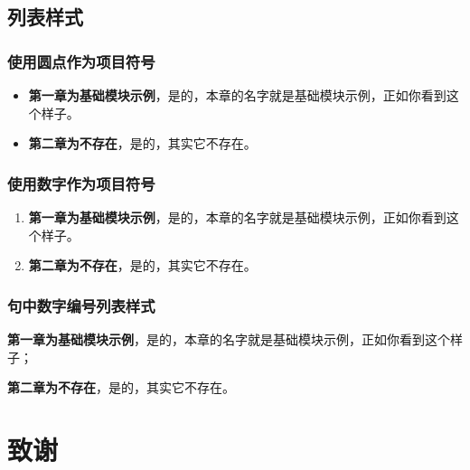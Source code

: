 \documentclass[a4paper,AutoFakeBold,oneside,12pt]{book}
\begin{document}
\section{列表样式}

\subsection{使用圆点作为项目符号}

\begin{itemize}
\item \textbf{第一章为基础模块示例}，是的，本章的名字就是基础模块示例，正如你看到这个样子。
\item \textbf{第二章为不存在}，是的，其实它不存在。
\end{itemize}

\subsection{使用数字作为项目符号}

\begin{enumerate}
\item \textbf{第一章为基础模块示例}，是的，本章的名字就是基础模块示例，正如你看到这个样子。
\item \textbf{第二章为不存在}，是的，其实它不存在。
\end{enumerate}

\subsection{句中数字编号列表样式}

\begin{enumerate*}
    \item \textbf{第一章为基础模块示例}，是的，本章的名字就是基础模块示例，正如你看到这个样子；
    \item \textbf{第二章为不存在}，是的，其实它不存在。
\end{enumerate*}

\clearpage{}


\clearpage{}
\chapter*{致\qquad{}谢}
\normalsize\thankwords
\end{document}
